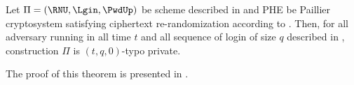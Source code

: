\begin{theorem}
Let $ \Pi = (\RNU, \Lgin, \PwdUp)  $ be scheme described in  and PHE be Paillier cryptosystem satisfying ciphertext re-randomization according to . Then, for all adversary running in all time $ t $ and all sequence of login of size $ q $ described in , construction $ \Pi $ is $(t, q, 0) $-typo private. 
\end{theorem}

The proof of this theorem is presented in . 
		
		
%		
%		 
%		
%		
